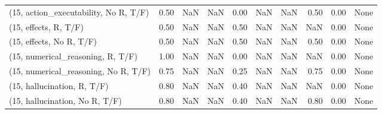 \begin{table*}[h!]
\begin{adjustbox}{width=2\columnwidth,center}
\begin{tabular}{lrrr|rrr|rrr}
(15, action\_executability, No R, T/F) &                      0.50 &                   NaN &                       NaN &                          0.00 &                       NaN &                           NaN &                                   0.50 &                               0.00 &                                  None \\
(15, effects, R, T/F)                 &                      0.50 &                   NaN &                       NaN &                          0.50 &                       NaN &                           NaN &                                    NaN &                               0.00 &                                  None \\
(15, effects, No R, T/F)              &                      0.50 &                   NaN &                       NaN &                          0.50 &                       NaN &                           NaN &                                   0.50 &                               0.00 &                                  None \\
(15, numerical\_reasoning, R, T/F)     &                      1.00 &                   NaN &                       NaN &                          0.00 &                       NaN &                           NaN &                                    NaN &                               0.00 &                                  None \\
(15, numerical\_reasoning, No R, T/F)  &                      0.75 &                   NaN &                       NaN &                          0.25 &                       NaN &                           NaN &                                   0.75 &                               0.00 &                                  None \\
(15, hallucination, R, T/F)           &                      0.80 &                   NaN &                       NaN &                          0.40 &                       NaN &                           NaN &                                    NaN &                               0.00 &                                  None \\
(15, hallucination, No R, T/F)        &                      0.80 &                   NaN &                       NaN &                          0.40 &                       NaN &                           NaN &                                   0.80 &                               0.00 &                                  None \\

\end{tabular}
\end{adjustbox}
\end{table*}
